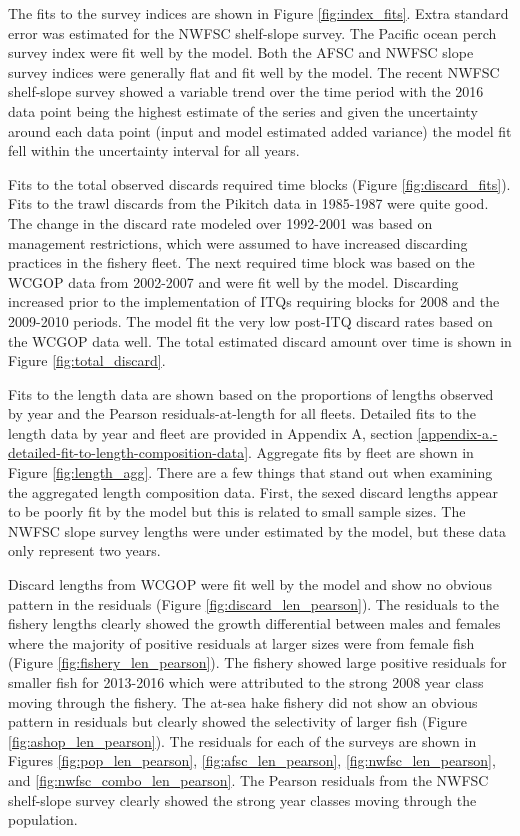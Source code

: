 \documentclass[12pt,]{article}
\begin{document}
The fits to the survey indices are shown in Figure \ref{fig:index_fits}.
Extra standard error was estimated for the NWFSC shelf-slope survey. The
Pacific ocean perch survey index were fit well by the model. Both the
AFSC and NWFSC slope survey indices were generally flat and fit well by
the model. The recent NWFSC shelf-slope survey showed a variable trend
over the time period with the 2016 data point being the highest estimate
of the series and given the uncertainty around each data point (input
and model estimated added variance) the model fit fell within the
uncertainty interval for all years.

Fits to the total observed discards required time blocks (Figure
\ref{fig:discard_fits}). Fits to the trawl discards from the Pikitch
data in 1985-1987 were quite good. The change in the discard rate
modeled over 1992-2001 was based on management restrictions, which were
assumed to have increased discarding practices in the fishery fleet. The
next required time block was based on the WCGOP data from 2002-2007 and
were fit well by the model. Discarding increased prior to the
implementation of ITQs requiring blocks for 2008 and the 2009-2010
periods. The model fit the very low post-ITQ discard rates based on the
WCGOP data well. The total estimated discard amount over time is shown
in Figure \ref{fig:total_discard}.

Fits to the length data are shown based on the proportions of lengths
observed by year and the Pearson residuals-at-length for all fleets.
Detailed fits to the length data by year and fleet are provided in
Appendix A, section
\ref{appendix-a.-detailed-fit-to-length-composition-data}. Aggregate
fits by fleet are shown in Figure \ref{fig:length_agg}. There are a few
things that stand out when examining the aggregated length composition
data. First, the sexed discard lengths appear to be poorly fit by the
model but this is related to small sample sizes. The NWFSC slope survey
lengths were under estimated by the model, but these data only represent
two years.

Discard lengths from WCGOP were fit well by the model and show no
obvious pattern in the residuals (Figure \ref{fig:discard_len_pearson}).
The residuals to the fishery lengths clearly showed the growth
differential between males and females where the majority of positive
residuals at larger sizes were from female fish (Figure
\ref{fig:fishery_len_pearson}). The fishery showed large positive
residuals for smaller fish for 2013-2016 which were attributed to the
strong 2008 year class moving through the fishery. The at-sea hake
fishery did not show an obvious pattern in residuals but clearly showed
the selectivity of larger fish (Figure \ref{fig:ashop_len_pearson}). The
residuals for each of the surveys are shown in Figures
\ref{fig:pop_len_pearson}, \ref{fig:afsc_len_pearson},
\ref{fig:nwfsc_len_pearson}, and \ref{fig:nwfsc_combo_len_pearson}. The
Pearson residuals from the NWFSC shelf-slope survey clearly showed the
strong year classes moving through the population.
\end{document}
